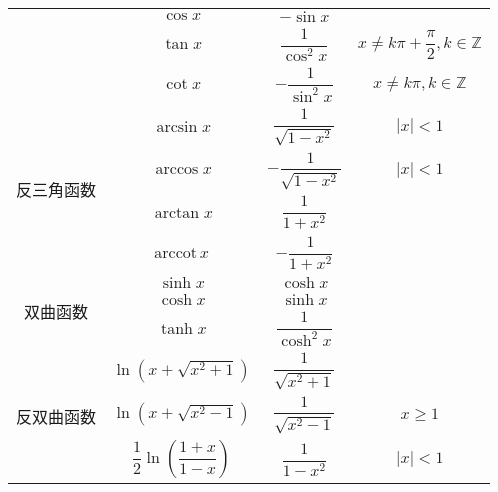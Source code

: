 \begin{table}
\begin{tabular}{|c|c|c|c|}
                                & $\cos x$                                            & $-\sin x$                    &                                                \\
                                & $\tan x$                                            & $\dfrac{1}{\cos^{2}x}$       & $x \ne k\pi + \dfrac{\pi}{2}, k\in \mathbb{Z}$ \\
                                & $\cot x$                                            & $-\dfrac{1}{\sin^{2}x}$      & $x \ne k\pi, k\in \mathbb{Z}$                  \\[5pt]
    \hline
    \multirow{4}{*}{反三角函数} & $\arcsin x$                                         & $\dfrac{1}{\sqrt{1 - x^2}}$  & $|x| < 1$                                      \\
                                & $\arccos x$                                         & $-\dfrac{1}{\sqrt{1 - x^2}}$ & $|x| < 1$                                      \\
                                & $\arctan x$                                         & $\dfrac{1}{1 + x^2}$         &                                                \\
                                & $\mathrm{arccot}\, x$                               & $-\dfrac{1}{1 + x^2}$        &                                                \\[5pt]
    \hline
    \multirow{3}{*}{双曲函数}   & $\sinh x$                                           & $\cosh x$                    &                                                \\
                                & $\cosh x$                                           & $\sinh x$                    &                                                \\
                                & $\tanh x$                                           & $\dfrac{1}{\cosh^{2}x}$      &                                                \\[5pt]
    \hline
    \multirow{3}{*}{反双曲函数} & $\ln (x + \sqrt{x^2 + 1})$                          & $\dfrac{1}{\sqrt{x^2 + 1}}$  &                                                \\
                                & $\ln (x + \sqrt{x^2 - 1})$                          & $\dfrac{1}{\sqrt{x^2 - 1}}$  & $x \geqslant 1$                                \\
                                & $\dfrac{1}{2}\ln \left(\dfrac{1 + x}{1 - x}\right)$ & $\dfrac{1}{1 - x^2}$         & $|x| < 1$                                      \\[5pt]
    \hline
  \end{tabular}
\end{table}

